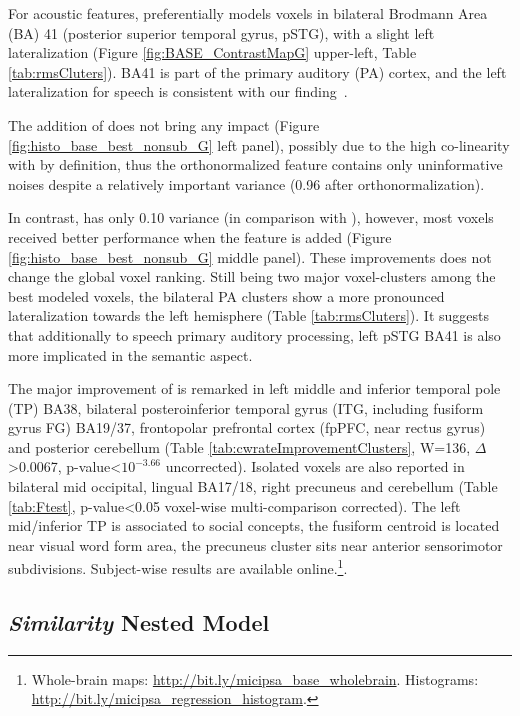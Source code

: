 For acoustic features,  preferentially models voxels in bilateral Brodmann Area (BA) 41 (posterior superior temporal gyrus, pSTG), with a slight left lateralization (Figure \ref{fig:BASE_ContrastMapG} upper-left, Table \ref{tab:rmsCluters}). BA41 is part of the primary auditory (PA) cortex, and the left lateralization for speech is consistent with our finding~\parencite{tervaniemiLateralizationAuditorycortexFunctions2003}.

The addition of  does not bring any impact (Figure \ref{fig:histo_base_best_nonsub_G} left panel), possibly due to the high co-linearity with  by definition, thus the orthonormalized feature contains only uninformative noises despite a relatively important variance (0.96 after orthonormalization). 

In contrast,  has only 0.10 variance (in comparison with ), however, most voxels received better performance when the feature is added (Figure \ref{fig:histo_base_best_nonsub_G} middle panel). These improvements does not change the global voxel ranking. Still being two major voxel-clusters among the best modeled voxels, the bilateral PA clusters show a more pronounced lateralization towards the left hemisphere (Table \ref{tab:rmsCluters}). It suggests that additionally to speech primary auditory processing, left pSTG BA41 is also more implicated in the semantic aspect. 

The major improvement of  is remarked in left middle and inferior temporal pole (TP) BA38, bilateral posteroinferior temporal gyrus (ITG, including fusiform gyrus FG) BA19/37, frontopolar prefrontal cortex (fpPFC, near rectus gyrus) and posterior cerebellum (Table \ref{tab:cwrateImprovementClusters}, W=136, \(\Delta\)>0.0067, p-value<\(10^{-3.66}\) uncorrected). Isolated voxels are also reported in bilateral mid occipital, lingual BA17/18, right precuneus and cerebellum (Table \ref{tab:Ftest}, p-value<0.05 voxel-wise multi-comparison corrected). The left mid\slash inferior TP is associated to social concepts, the fusiform centroid is located near visual word form area, the precuneus cluster sits near anterior sensorimotor subdivisions. Subject-wise results are available online.\footnote{Whole-brain maps: \url{http://bit.ly/micipsa_base_wholebrain}. Histograms: \url{http://bit.ly/micipsa_regression_histogram}.}.

\subsection{\emph{Similarity} Nested Model}

